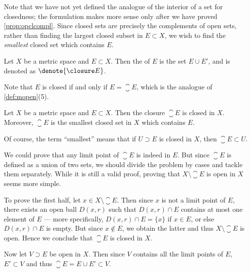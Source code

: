 Note that we have not yet defined
the analogue of the interior of a set for closedness;
the formulation makes more sense
only after we have proved \cref{prop:opclcompl}.
Since closed sets are precisely the complements of open sets,
rather than finding the largest closed subset in \(E\subset X\),
we wish to find the \emph{smallest} closed set which contains \(E\).

\begin{definition}
    \label{def:closure}
    Let \(X\) be a metric space and \(E\subset X\).
    Then the  of \(E\)
    is the set \(E\cup E'\), and is denoted as \(\denote{\closure E}\).
\end{definition}

Note that \(E\) is closed if and only if \(E=\closure E\),
which is the analogue of \cref{def:mopen}(5).

\begin{observation}
    \label{obv:closure}
    Let \(X\) be a metric space and \(E\subset X\).
    Then the closure \(\closure E\) is closed in \(X\).
    Moreover, \(\closure E\) is the smallest closed set in \(X\)
    which contains \(E\).
\end{observation}
Of course, the term ``smallest'' means that
if \(U\supset E\) is closed in \(X\), then \(\closure E\subset U\).
\begin{sketch}
    We could prove that
    any limit point of \(\closure E\) is indeed in \(E\).
    But since \(\closure E\) is defined as a union of two sets,
    we should divide the problem by cases and tackle them separately.
    While it is still a valid proof,
    proving that \(X\setminus\closure E\) is open in \(X\)
    seems more simple.
\end{sketch}
\begin{myproof}
    To prove the first half,
    let \(x\in X\setminus\closure E\).
    Then since \(x\) is not a limit point of \(E\),
    there exists an open ball \(D(x,r)\) such that
    \(D(x,r)\cap E\) contains at most one element of \(E\)
    ---
    more specifically, \(D(x,r)\cap E=\{x\}\) if \(x\in E\),
    or else \(D(x,r)\cap E\) is empty.
    But since \(x\notin E\),
    we obtain the latter and thus \(X\setminus\closure E\) is open.
    Hence we conclude that \(\closure E\) is closed in \(X\).

    Now let \(V\supset E\) be open in \(X\).
    Then since \(V\) contains all the limit points of \(E\),
    \(E'\subset V\) and thus \(\closure E=E\cup E'\subset V\).
\end{myproof}

